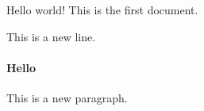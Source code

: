 \documentclass{article}
\begin{document}
    Hello world!
    This is the first document.

    This is a new line.

    \paragraph{Hello}
    This is a new paragraph.
\end{document}
